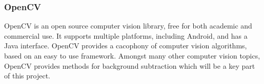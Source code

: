 \subsubsection{OpenCV}

OpenCV\cite{opencv} is an open source computer vision library, free for both academic and commercial use. It supports multiple platforms, including Android, and has a Java interface. OpenCV provides a cacophony of computer vision algorithms, based on an easy to use framework. Amongst many other computer vision topics, OpenCV provides methods for background subtraction which will be a key part of this project.